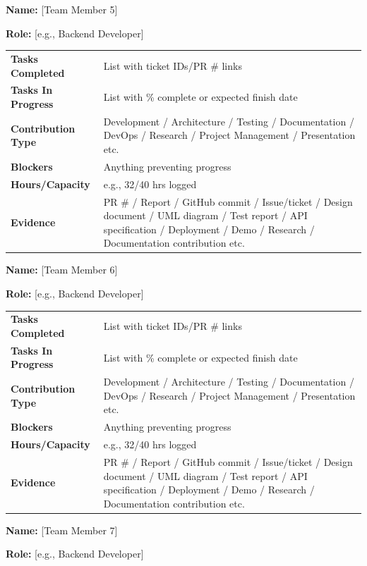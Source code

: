 \documentclass[11pt,a4paper]{article}
\newcommand{\field}[2]{\textbf{#1:} #2\par}
\begin{document}
\field{Name}{[Team Member 5]}
\field{Role}{[e.g., Backend Developer]}

\vspace{4pt}

\begin{tabular}{>{\bfseries}p{} p{}}
\toprule
Tasks Completed & List with ticket IDs/PR \# links \\
Tasks In Progress & List with \% complete or expected finish date \\
Contribution Type & Development / Architecture / Testing / Documentation / DevOps / Research / Project Management / Presentation etc.\\
Blockers & Anything preventing progress \\
Hours/Capacity & e.g., 32/40 hrs logged \\
Evidence & PR \# / Report / GitHub commit / Issue/ticket / Design document / UML diagram / Test report / API specification / Deployment / Demo / Research / Documentation contribution etc.\\
\bottomrule
\end{tabular}

\vspace{10pt}

\field{Name}{[Team Member 6]}
\field{Role}{[e.g., Backend Developer]}

\vspace{4pt}

\begin{tabular}{>{\bfseries}p{} p{}}
\toprule
Tasks Completed & List with ticket IDs/PR \# links \\
Tasks In Progress & List with \% complete or expected finish date \\
Contribution Type & Development / Architecture / Testing / Documentation / DevOps / Research / Project Management / Presentation etc.\\
Blockers & Anything preventing progress \\
Hours/Capacity & e.g., 32/40 hrs logged \\
Evidence & PR \# / Report / GitHub commit / Issue/ticket / Design document / UML diagram / Test report / API specification / Deployment / Demo / Research / Documentation contribution etc.\\
\bottomrule
\end{tabular}

\vspace{37pt}

\field{Name}{[Team Member 7]}
\field{Role}{[e.g., Backend Developer]}
\end{document}
